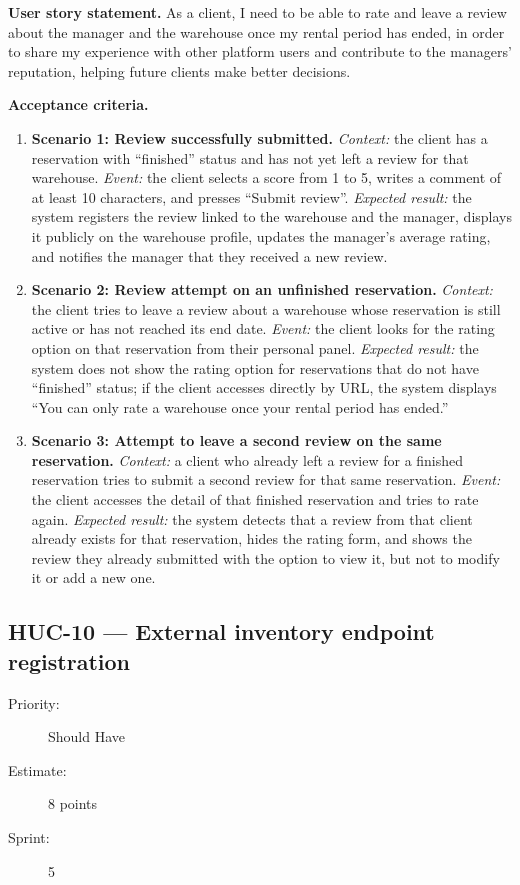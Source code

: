 \documentclass[11pt,a4paper,oneside]{report}
\begin{document}
\textbf{User story statement.} As a client, I need to be able to rate and leave a review about the manager and the warehouse once my rental period has ended, in order to share my experience with other platform users and contribute to the managers' reputation, helping future clients make better decisions.

\textbf{Acceptance criteria.}
\begin{enumerate}
\item \textbf{Scenario 1: Review successfully submitted.} \emph{Context:} the client has a reservation with ``finished'' status and has not yet left a review for that warehouse. \emph{Event:} the client selects a score from 1 to 5, writes a comment of at least 10 characters, and presses ``Submit review''. \emph{Expected result:} the system registers the review linked to the warehouse and the manager, displays it publicly on the warehouse profile, updates the manager's average rating, and notifies the manager that they received a new review.
\item \textbf{Scenario 2: Review attempt on an unfinished reservation.} \emph{Context:} the client tries to leave a review about a warehouse whose reservation is still active or has not reached its end date. \emph{Event:} the client looks for the rating option on that reservation from their personal panel. \emph{Expected result:} the system does not show the rating option for reservations that do not have ``finished'' status; if the client accesses directly by URL, the system displays ``You can only rate a warehouse once your rental period has ended.''
\item \textbf{Scenario 3: Attempt to leave a second review on the same reservation.} \emph{Context:} a client who already left a review for a finished reservation tries to submit a second review for that same reservation. \emph{Event:} the client accesses the detail of that finished reservation and tries to rate again. \emph{Expected result:} the system detects that a review from that client already exists for that reservation, hides the rating form, and shows the review they already submitted with the option to view it, but not to modify it or add a new one.
\end{enumerate}

\subsection{HUC-10 --- External inventory endpoint registration}
\label{req:HUC-10}
\begin{description}
\item[Priority:] Should Have \quad \item[Estimate:] 8 points \quad \item[Sprint:] 5
\end{description}
\end{document}
